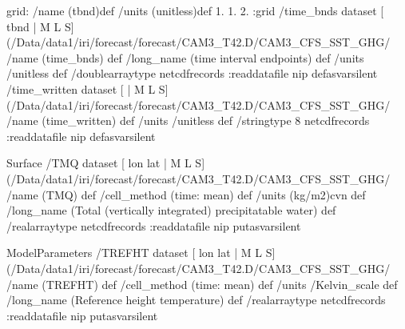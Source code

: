 grid:
/name (tbnd)def
/units (unitless)def
 1. 1. 2.
:grid
 /time_bnds{
dataset
[ tbnd | M L S] (/Data/data1/iri/forecast/forecast/CAM3_T42.D/CAM3_CFS_SST_GHG/%
/name (time_bnds) def
 /long_name (time interval endpoints) def
 /units /unitless def
 /doublearraytype netcdfrecords :readdatafile
nip
}defasvarsilent
 /time_written{
dataset
[ | M L S] (/Data/data1/iri/forecast/forecast/CAM3_T42.D/CAM3_CFS_SST_GHG/%
/name (time_written) def
 /units /unitless def
 /stringtype 8 netcdfrecords :readdatafile
nip
}defasvarsilent

\begin{ingrid}

Surface /TMQ{
dataset
[ lon lat | M L S] (/Data/data1/iri/forecast/forecast/CAM3_T42.D/CAM3_CFS_SST_GHG/%
/name (TMQ) def
 /cell_method (time: mean) def
 /units (kg/m2)cvn def
 /long_name (Total (vertically integrated) precipitatable water) def
 /realarraytype netcdfrecords :readdatafile
nip
}putasvarsilent



ModelParameters /TREFHT{
dataset
[ lon lat | M L S] (/Data/data1/iri/forecast/forecast/CAM3_T42.D/CAM3_CFS_SST_GHG/%
/name (TREFHT) def
 /cell_method (time: mean) def
 /units /Kelvin_scale def
 /long_name (Reference height temperature) def
 /realarraytype netcdfrecords :readdatafile
nip
}putasvarsilent


\end{ingrid}
